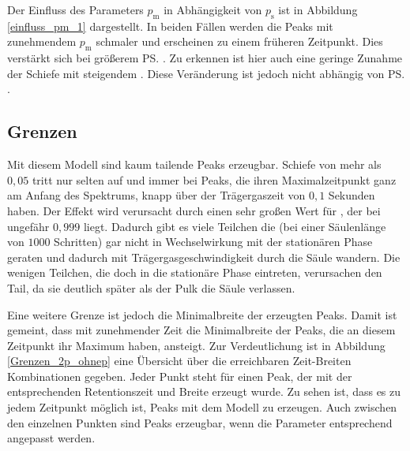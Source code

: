 Der Einfluss des Parameters $p_{\text{m}}$ in Abhängigkeit von $p_{\text{s}}$ ist in Abbildung \ref{einfluss_pm_1} dargestellt. In beiden Fällen werden die Peaks mit zunehmendem $p_{\text{m}}$ schmaler und erscheinen zu einem früheren Zeitpunkt. Dies verstärkt sich bei größerem \ps. 
Zu erkennen ist hier auch eine geringe Zunahme der Schiefe mit steigendem \pm. Diese Veränderung ist jedoch nicht abhängig von \ps.




\subsection{Grenzen}
Mit diesem Modell sind kaum tailende Peaks erzeugbar. Schiefe von mehr als $0,05$ tritt nur selten auf und immer bei Peaks, die ihren Maximalzeitpunkt ganz am Anfang des Spektrums, knapp über der Trägergaszeit von $0,1$ Sekunden haben. Der Effekt wird verursacht durch einen sehr großen Wert für \pm, der bei ungefähr $0,999$ liegt. Dadurch gibt es viele Teilchen die (bei einer Säulenlänge von $1000$ Schritten) gar nicht in Wechselwirkung mit der stationären Phase geraten und dadurch mit Trägergasgeschwindigkeit durch die Säule wandern. Die wenigen Teilchen, die doch in die stationäre Phase eintreten, verursachen den Tail, da sie deutlich später als der Pulk die Säule verlassen.

Eine weitere Grenze ist jedoch die Minimalbreite der erzeugten Peaks. Damit ist gemeint, dass mit zunehmender Zeit die Minimalbreite der Peaks, die an diesem Zeitpunkt ihr Maximum haben, ansteigt. Zur Verdeutlichung ist in Abbildung \ref{Grenzen_2p_ohnep} eine Übersicht über die erreichbaren Zeit-Breiten Kombinationen gegeben. Jeder Punkt steht für einen Peak, der mit der entsprechenden Retentionszeit und Breite erzeugt wurde.
Zu sehen ist, dass es zu jedem Zeitpunkt möglich ist, Peaks mit dem Modell zu erzeugen. Auch zwischen den einzelnen Punkten sind Peaks erzeugbar, wenn die Parameter entsprechend angepasst werden.

